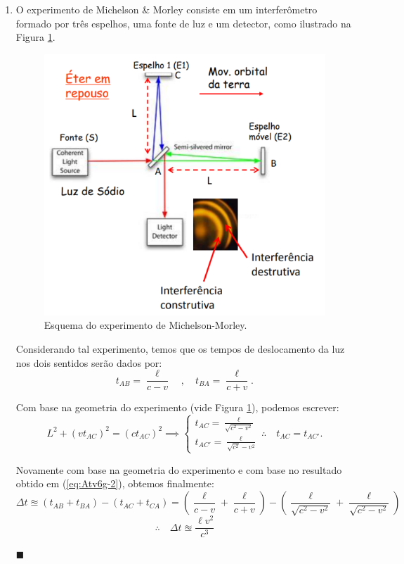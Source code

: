 \documentclass[12pt,a4paper]{article}
\begin{document}
\begin{enumerate}[label = \alph*)]
    \item O experimento de Michelson \& Morley consiste em um interferômetro formado por três espelhos, uma fonte de luz e um detector, como ilustrado na Figura \ref{fig:Michelson-Morley}.
    \begin{figure}[htp!]
        \centering
        \includegraphics[width=0.5\linewidth]{Figures/Michelson-Morley.png}
        \caption{Esquema do experimento de Michelson-Morley.}
        \label{fig:Michelson-Morley}
    \end{figure}

    Considerando tal experimento, temos que os tempos de deslocamento da luz nos dois sentidos serão dados por:
    \begin{equation}\label{eq:Atv6g-1}
        t_{AB}=\frac{\ell}{c-v}\quad,\quad t_{BA}=\frac{\ell}{c+v}. 
    \end{equation}

    Com base na geometria do experimento (vide Figura \ref{fig:Michelson-Morley}), podemos escrever:
    \begin{equation}
        L^2+\left(vt_{AC}\right)^2=\left(ct_{AC}\right)^2\implies
        \begin{cases}\label{eq:Atv6g-2}
            t_{AC}=\frac{\ell}{\sqrt{c^2-v^2}} \\
            t_{AC'}=\frac{\ell}{\sqrt{c^2}-v^2}
        \end{cases}\therefore\quad
        t_{AC}=t_{AC'}.
    \end{equation}

    Novamente com base na geometria do experimento e com base no resultado obtido em (\ref{eq:Atv6g-2}), obtemos finalmente:
    \begin{equation*}
        \Delta t\approxeq\left(t_{AB}+t_{BA}\right)-\left(t_{AC}+t_{CA}\right)=\left(\frac{\ell}{c-v}+\frac{\ell}{c+v}\right)-\left(\frac{\ell}{\sqrt{c^2-v^2}}+\frac{\ell}{\sqrt{c^2-v^2}}\right)
    \end{equation*}
    \begin{equation}\label{eq:Atv6g-3}
        \therefore\quad\boxed{\Delta t\approxeq\frac{\ell v^2}{c^{3}}}
    \end{equation}
    \begin{flushright}
        $\blacksquare$
    \end{flushright}




\end{enumerate}
\end{document}
